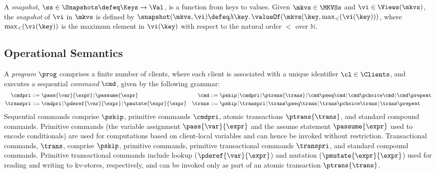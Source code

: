 \begin{definition}[Snapshots]
\label{def:heaps}
\label{def:snapshot}
A \emph{snapshot}, \( \ss \in \Snapshots  \defeq \Keys \to
\Val\),  is a function  from keys to values.
Given $\mkvs \in \MKVSs$ and $\vi \in \Views(\mkvs)$, the \emph{snapshot} of $\vi$ in 
$\mkvs$ is defined by  $\snapshot(\mkvs, \vi) \defeq \lambda \key \ldotp \valueOf(\mkvs(\key, \max_{<}(\vi(\key)))$, 
where $\max_{<}(\vi(\key))$ is the maximum element in $\vi(\key)$ with respect to the natural 
order $<$ over $\mathbb{N}$.
\end{definition}


\subsection{Operational Semantics}

A \emph{program} \( \prog \) comprises a finite number of clients,
where each client is associated with a unique identifier \( \cl \in \Clients \), 
and executes a sequential \emph{command} $\cmd$, given by the following grammar:%
%
{\small%
\begin{align*}
\cmdpri & ::=  
\pass{\var}{\expr} \!\mid\! 
\passume{\expr} 
&
\cmd & ::=  
\pskip \!\mid\!
\cmdpri \!\mid\!  
\ptrans{\trans} \!\mid\! 
\cmd \pseq \cmd \!\mid\! 
\cmd \pchoice \cmd \!\mid\! 
\cmd \prepeat  
\\
\transpri & ::= 
\cmdpri \!\mid\!
\pderef{\var}{\expr} \!\mid\!
\pmutate{\expr}{\expr} 
&
\trans & ::=
\pskip \!\mid\!
\transpri \!\mid\! 
\trans \pseq \trans \!\mid\!
\trans \pchoice \trans \!\mid\!
\trans\prepeat    
\end{align*}%
}%
%
%
Sequential commands  comprise $\pskip$,  primitive commands $\cmdpri
$, atomic transactions
$\ptrans{\trans}$,  and standard
compound commands. 
Primitive commands (the variable assignment
$\pass{\var}{\expr}$ and the assume statement $\passume{\expr}$
used to encode conditionals) are used for computations based on 
client-local variables 
and can hence be invoked without restriction. 
Transactional commands, $\trans$, 
comprise $\pskip$, primitive commands, 
primitive transactional commands $\transpri$,  and standard compound commands. 
Primitive transactional commands include lookup ($\pderef{\var}{\expr}$) and mutation 
($\pmutate{\expr}{\expr}$) used for reading and writing to kv-stores, respectively, and  
can be invoked only as part of an atomic transaction $\ptrans{\trans}$.

